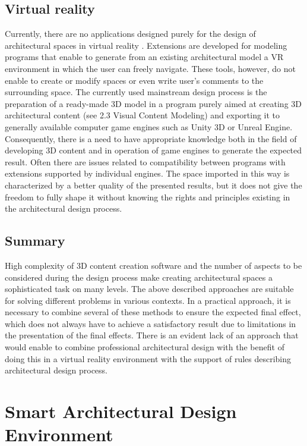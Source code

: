 \documentclass[runningheads]{llncs}
\begin{document}
\subsection{Virtual reality}
Currently, there are no applications designed purely for the design of architectural spaces in virtual reality . Extensions are developed for modeling programs that enable to generate from an existing architectural model a VR environment in which the user can freely navigate. These tools, however, do not enable to create or modify spaces or even write user’s comments to the surrounding space. The currently used mainstream design process is the preparation of a ready-made 3D model in a program purely aimed at creating 3D architectural content (see 2.3 Visual Content Modeling) and exporting it to generally available computer game engines such as Unity 3D or Unreal Engine. Consequently, there is a need to have appropriate knowledge both in the field of developing 3D content and in operation of game engines to generate the expected result. Often there are issues related to compatibility between programs with extensions supported by individual engines. The space imported in this way is characterized by a better quality of the presented results, but it does not give the freedom to fully shape it without knowing the rights and principles existing in the architectural design process.

\subsection{Summary}
High complexity of 3D content creation software and the number of aspects to be considered during the design process make creating architectural spaces a sophisticated task on many levels. The above described approaches are suitable for solving different problems in various contexts. In a practical approach, it is necessary to combine several of these methods to ensure the expected final effect, which does not always have to achieve a satisfactory result due to limitations in the presentation of the final effects.
There is an evident lack of an approach that would enable to combine professional architectural design with the benefit of doing this in a virtual reality environment with the support of rules describing architectural design process.

\section{Smart Architectural Design Environment}
\end{document}
